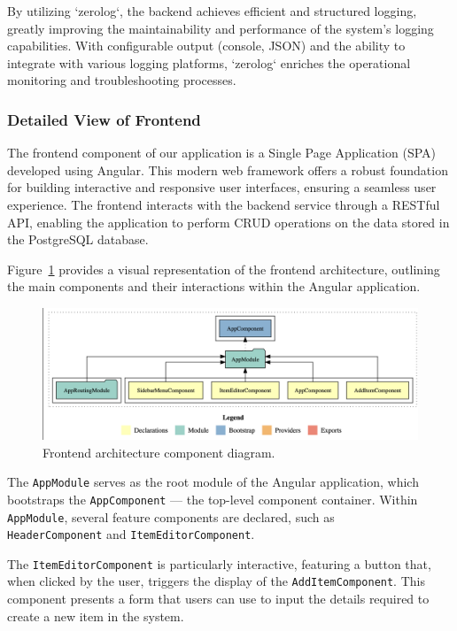 By utilizing `zerolog`, the backend achieves efficient and structured logging, greatly improving the maintainability and performance of the system's logging capabilities.
With configurable output (console, JSON) and the ability to integrate with various logging platforms, `zerolog` enriches the operational monitoring and troubleshooting processes.


\newpage

\subsubsection{Detailed View of Frontend}
The frontend component of our application is a Single Page Application (SPA) developed using Angular.
This modern web framework offers a robust foundation for building interactive and responsive user interfaces, ensuring a seamless user experience.
The frontend interacts with the backend service through a RESTful API, enabling the application to perform CRUD operations on the data stored in the PostgreSQL database.

Figure~\ref{fig:frontend_architecture} provides a visual representation of the frontend architecture, outlining the main components and their interactions within the Angular application.

\begin{figure}[H]
    \centering
    \includegraphics[width=\textwidth]{images/frontend/frontend_overview_component}
    \caption{Frontend architecture component diagram.}
    \label{fig:frontend_architecture}
\end{figure}

The \texttt{AppModule} serves as the root module of the Angular application, which bootstraps the \texttt{AppComponent} — the top-level component container.
Within \texttt{AppModule}, several feature components are declared, such as \\\texttt{HeaderComponent} and \texttt{ItemEditorComponent}.

The \texttt{ItemEditorComponent} is particularly interactive, featuring a button that, when clicked by the user, triggers the display of the \texttt{AddItemComponent}.
This component presents a form that users can use to input the details required to create a new item in the system.

